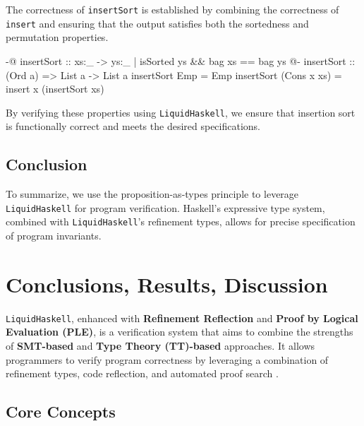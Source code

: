 \documentclass[]{rptuseminar}
\begin{document}
The correctness of \texttt{insertSort} is established by combining the correctness of \texttt{insert} and ensuring that the output satisfies 
both the sortedness and permutation properties.

\begin{haskell}
{-@ insertSort :: xs:_ -> {ys:_ | isSorted ys && bag xs == bag ys} @-}
insertSort :: (Ord a) => List a -> List a
insertSort Emp = Emp
insertSort (Cons x xs) = insert x (insertSort xs)
\end{haskell}

By verifying these properties using \texttt{LiquidHaskell}, we ensure that insertion 
sort is functionally correct and meets the desired specifications.
\subsection{Conclusion}
To summarize, we use the proposition-as-types principle to leverage \texttt{LiquidHaskell} for program verification.
Haskell's expressive type system, combined with \texttt{LiquidHaskell}'s refinement types, allows for precise specification of program invariants.
\label{sec:example}

\section{Conclusions, Results, Discussion}
\texttt{LiquidHaskell}, enhanced with \textbf{Refinement Reflection} and \textbf{Proof by Logical Evaluation (PLE)}, 
is a verification system that aims to combine the strengths of \textbf{SMT-based} and 
\textbf{Type Theory (TT)-based} approaches. It allows programmers to verify program correctness 
by leveraging a combination of refinement types, code reflection, and automated proof search \cite{vazou_refinement_2018}.

\subsection*{Core Concepts}
\end{document}
